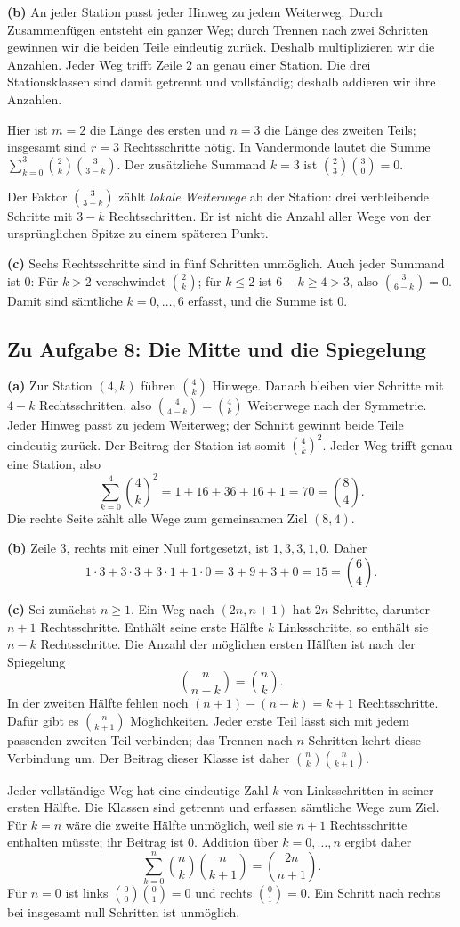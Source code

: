 \textbf{(b)} An jeder Station passt jeder Hinweg zu jedem Weiterweg.
Durch Zusammenfügen entsteht ein ganzer Weg; durch Trennen nach zwei
Schritten gewinnen wir die beiden Teile eindeutig zurück. Deshalb
multiplizieren wir die Anzahlen. Jeder Weg trifft Zeile $2$ an genau
einer Station. Die drei Stationsklassen sind damit getrennt und
vollständig; deshalb addieren wir ihre Anzahlen.

Hier ist $m=2$ die Länge des ersten und $n=3$ die Länge des zweiten
Teils; insgesamt sind $r=3$ Rechtsschritte nötig. In Vandermonde lautet
die Summe $\sum_{k=0}^3\binom2k\binom3{3-k}$.
Der zusätzliche Summand $k=3$ ist $\binom23\binom30=0$.

Der Faktor $\binom3{3-k}$ zählt \emph{lokale Weiterwege} ab der
Station: drei verbleibende Schritte mit $3-k$ Rechtsschritten.
Er ist nicht die Anzahl aller Wege von der ursprünglichen Spitze
zu einem späteren Punkt.

\textbf{(c)} Sechs Rechtsschritte sind in fünf Schritten unmöglich.
Auch jeder Summand ist $0$: Für $k>2$ verschwindet $\binom2k$;
für $k\le2$ ist $6-k\ge4>3$, also $\binom3{6-k}=0$.
Damit sind sämtliche $k=0,\ldots,6$ erfasst, und die Summe ist $0$.

\subsection*{Zu Aufgabe 8: Die Mitte und die Spiegelung}
\textbf{(a)} Zur Station $(4,k)$ führen $\binom4k$ Hinwege. Danach
bleiben vier Schritte mit $4-k$ Rechtsschritten, also
$\binom4{4-k}=\binom4k$ Weiterwege nach der Symmetrie.
Jeder Hinweg passt zu jedem Weiterweg; der Schnitt gewinnt beide
Teile eindeutig zurück. Der Beitrag der Station ist somit $\binom4k^2$.
Jeder Weg trifft genau eine Station, also
\[
 \sum_{k=0}^4\binom4k^2=1+16+36+16+1=70=\binom84.
\]
Die rechte Seite zählt alle Wege zum gemeinsamen Ziel $(8,4)$.

\textbf{(b)} Zeile $3$, rechts mit einer Null fortgesetzt, ist
$1,3,3,1,0$. Daher
\[
 1\cdot3+3\cdot3+3\cdot1+1\cdot0=3+9+3+0=15=\binom64.
\]

\textbf{(c)} Sei zunächst $n\ge1$. Ein Weg nach $(2n,n+1)$ hat $2n$
Schritte, darunter $n+1$ Rechtsschritte. Enthält seine erste Hälfte
$k$ Linksschritte, so enthält sie $n-k$ Rechtsschritte. Die Anzahl
der möglichen ersten Hälften ist nach der Spiegelung
\[
 \binom n{n-k}=\binom nk.
\]
In der zweiten Hälfte fehlen noch $(n+1)-(n-k)=k+1$ Rechtsschritte.
Dafür gibt es $\binom n{k+1}$ Möglichkeiten. Jeder erste Teil lässt
sich mit jedem passenden zweiten Teil verbinden; das Trennen nach
$n$ Schritten kehrt diese Verbindung um. Der Beitrag dieser Klasse
ist daher $\binom nk\binom n{k+1}$.

Jeder vollständige Weg hat eine eindeutige Zahl $k$ von Linksschritten
in seiner ersten Hälfte. Die Klassen sind getrennt und erfassen
sämtliche Wege zum Ziel. Für $k=n$ wäre die zweite Hälfte unmöglich,
weil sie $n+1$ Rechtsschritte enthalten müsste; ihr Beitrag ist $0$.
Addition über $k=0,\ldots,n$ ergibt daher
\[
 \sum_{k=0}^n\binom nk\binom n{k+1}=\binom{2n}{n+1}.
\]
Für $n=0$ ist links $\binom00\binom01=0$ und rechts $\binom01=0$.
Ein Schritt nach rechts bei insgesamt null Schritten ist unmöglich.
